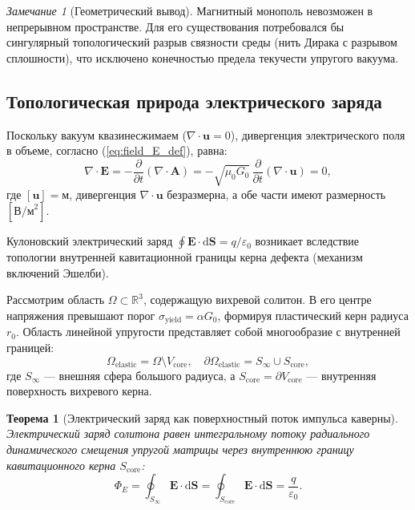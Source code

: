 \documentclass[11pt,a4paper]{article}
\newtheorem{theorem}{Теорема}
\theoremstyle{definition}
\theoremstyle{remark}
\newtheorem{remark}{Замечание}
\begin{document}
\begin{remark}[Геометрический вывод]
Магнитный монополь невозможен в непрерывном пространстве. Для его существования потребовался бы сингулярный топологический разрыв связности среды (нить Дирака с разрывом сплошности), что исключено конечностью предела текучести упругого вакуума.
\end{remark}
	
\subsection{Топологическая природа электрического заряда}
	
Поскольку вакуум квазинесжимаем ($\nabla \cdot \mathbf{u} = 0$), дивергенция электрического поля в объеме, согласно (\ref{eq:field_E_def}), равна:
\begin{equation}
	\nabla \cdot \mathbf{E} = -\frac{\partial}{\partial t}(\nabla \cdot \mathbf{A}) = -\sqrt{\mu_0 G_0} \, \frac{\partial}{\partial t}(\nabla \cdot \mathbf{u}) = 0,
\label{eq:div_E_gauge}
\end{equation}
где $[\mathbf{u}] = \text{м}$, дивергенция $\nabla \cdot \mathbf{u}$ безразмерна, а обе части имеют размерность $[\text{В/м}^2]$.
	
Кулоновский электрический заряд $\oint \mathbf{E} \cdot \mathrm{d}\mathbf{S} = q/\varepsilon_0$ возникает вследствие топологии внутренней кавитационной границы керна дефекта (механизм включений Эшелби).
	
Рассмотрим область $\Omega \subset \mathbb{R}^3$, содержащую вихревой солитон. В его центре напряжения превышают порог $\sigma_{\mathrm{yield}} = \alpha G_0$, формируя пластический керн радиуса $r_0$. Область линейной упругости представляет собой многообразие с внутренней границей:
\begin{equation}
	\Omega_{\mathrm{elastic}} = \Omega \setminus V_{\mathrm{core}}, \quad \partial \Omega_{\mathrm{elastic}} = S_\infty \cup S_{\mathrm{core}},
\label{eq:manifold_boundaries}
\end{equation}
где $S_\infty$ — внешняя сфера большого радиуса, а $S_{\mathrm{core}} = \partial V_{\mathrm{core}}$ — внутренняя поверхность вихревого керна.
	
\begin{theorem}[Электрический заряд как поверхностный поток импульса каверны]
\label{thm:gauss_charge_boundary}
Электрический заряд солитона равен интегральному потоку радиального динамического смещения упругой матрицы через внутреннюю границу кавитационного керна $S_{\mathrm{core}}$:
\begin{equation}
	\Phi_E = \oint_{S_\infty} \mathbf{E} \cdot \mathrm{d}\mathbf{S} = \oint_{S_{\mathrm{core}}} \mathbf{E} \cdot \mathrm{d}\mathbf{S} = \frac{q}{\varepsilon_0}.
	\label{eq:gauss_charge_flux}
\end{equation}
\end{theorem}
\end{document}
